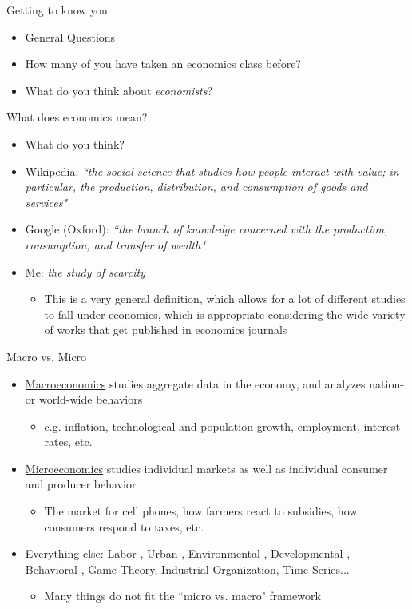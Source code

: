 \documentclass[10pt,xcolor={svgnames}]{beamer}
\begin{document}
\begin{frame}{Getting to know you}
\begin{itemize}[<+>]
    \item General Questions
    \item How many of you have taken an economics class before?
    \item What do you think about \textit{economists}?
\end{itemize}
\end{frame}

\begin{frame}{What does economics mean?}
\begin{itemize}[<+>]
    \item What do you think?\vspace{23mm}
    \item Wikipedia: \textit{``the social science that studies how people interact with value; in particular, the production, distribution, and consumption of goods and services"}
    \item Google (Oxford): \textit{``the branch of knowledge concerned with the production, consumption, and transfer of wealth"}
    \item<3-> Me: \textit{the study of scarcity}
    \begin{itemize}
        \item This is a very general definition, which allows for a lot of different studies to fall under economics, which is appropriate considering the wide variety of works that get published in economics journals
    \end{itemize}
\end{itemize}
\end{frame}

\begin{frame}{Macro vs. Micro}
\begin{itemize}[<+->]
    \item \underline{Macroeconomics} studies aggregate data in the economy, and analyzes nation- or world-wide behaviors 
    \begin{itemize}[<+->]
        \item e.g. inflation, technological and population growth, employment, interest rates, etc. 
    \end{itemize}
    \item \underline{Microeconomics} studies individual markets as well as individual consumer and producer behavior
    \begin{itemize}
        \item The market for cell phones, how farmers react to subsidies, how consumers respond to taxes, etc. 
    \end{itemize}
    \item Everything else: Labor-, Urban-, Environmental-, Developmental-, Behavioral-, Game Theory, Industrial Organization, Time Series...
    \begin{itemize}
        \item Many things do not fit the ``micro vs. macro" framework
    \end{itemize}
\end{itemize}
\end{frame}
\end{document}
